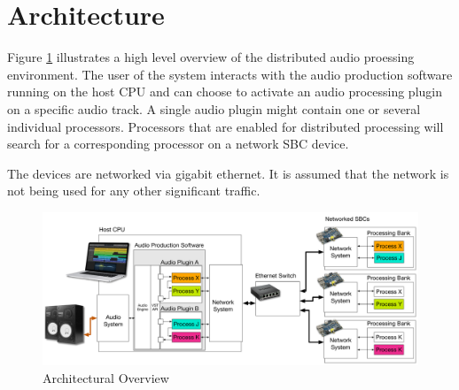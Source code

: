 \section{Architecture}

Figure \ref{fig:arch_01} illustrates a high level overview of the distributed audio proessing environment. The user of the system interacts with the audio production software running on the host CPU and can choose to activate an audio processing plugin on a specific audio track. A single audio plugin might contain one or several individual processors. Processors that are enabled for distributed processing will search for a corresponding processor on a network SBC device.

The devices are networked via gigabit ethernet. It is assumed that the network is not being used for any other significant traffic.

\begin{figure}[H]
    \centering
    \includegraphics[width=\textwidth]{assets/architecture_01.pdf}
    \caption{Architectural Overview}
    \label{fig:arch_01}
\end{figure}


